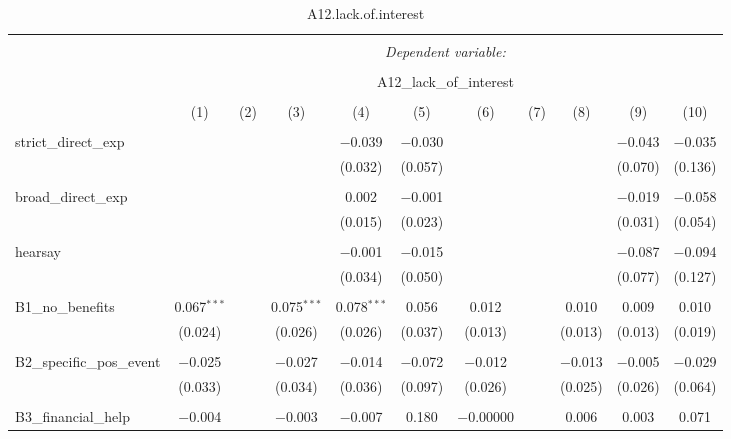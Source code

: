 
\begin{table}[H] \centering 
  \caption{A12.lack.of.interest} 
  \label{} 
\tiny 
\begin{tabular}{@{\extracolsep{4pt}}lcccccccccc} 
\\[-1.8ex]\hline 
\hline \\[-1.8ex] 
 & \multicolumn{10}{c}{\textit{Dependent variable:}} \\ 
\cline{2-11} 
\\[-1.8ex] & \multicolumn{10}{c}{A12\_lack\_of\_interest} \\ 
\\[-1.8ex] & (1) & (2) & (3) & (4) & (5) & (6) & (7) & (8) & (9) & (10)\\ 
\hline \\[-1.8ex] 
 strict\_direct\_exp &  &  &  & $-$0.039 & $-$0.030 &  &  &  & $-$0.043 & $-$0.035 \\ 
  &  &  &  & (0.032) & (0.057) &  &  &  & (0.070) & (0.136) \\ 
  & & & & & & & & & & \\ 
 broad\_direct\_exp &  &  &  & 0.002 & $-$0.001 &  &  &  & $-$0.019 & $-$0.058 \\ 
  &  &  &  & (0.015) & (0.023) &  &  &  & (0.031) & (0.054) \\ 
  & & & & & & & & & & \\ 
 hearsay &  &  &  & $-$0.001 & $-$0.015 &  &  &  & $-$0.087 & $-$0.094 \\ 
  &  &  &  & (0.034) & (0.050) &  &  &  & (0.077) & (0.127) \\ 
  & & & & & & & & & & \\ 
 B1\_no\_benefits & 0.067$^{***}$ &  & 0.075$^{***}$ & 0.078$^{***}$ & 0.056 & 0.012 &  & 0.010 & 0.009 & 0.010 \\ 
  & (0.024) &  & (0.026) & (0.026) & (0.037) & (0.013) &  & (0.013) & (0.013) & (0.019) \\ 
  & & & & & & & & & & \\ 
 B2\_specific\_pos\_event & $-$0.025 &  & $-$0.027 & $-$0.014 & $-$0.072 & $-$0.012 &  & $-$0.013 & $-$0.005 & $-$0.029 \\ 
  & (0.033) &  & (0.034) & (0.036) & (0.097) & (0.026) &  & (0.025) & (0.026) & (0.064) \\ 
  & & & & & & & & & & \\ 
 B3\_financial\_help & $-$0.004 &  & $-$0.003 & $-$0.007 & 0.180 & $-$0.00000 &  & 0.006 & 0.003 & 0.071 \\ 

\end{tabular}
\end{table}
